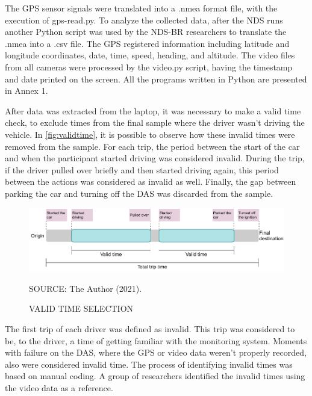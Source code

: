 The GPS sensor signals were translated into a .nmea format file, with the execution of gps-read.py. To analyze the collected data, after the NDS runs another Python script was used by the NDS-BR researchers to translate the .nmea into a .csv file. The GPS registered information including latitude and longitude coordinates, date, time, speed, heading, and altitude. The video files from all cameras were processed by the video.py script, having the timestamp and date printed on the screen. All the programs written in Python are presented in Annex 1. 

After data was extracted from the laptop, it was necessary to make a valid time check, to exclude times from the final sample where the driver wasn't driving the vehicle. In \autoref{fig:validtime}, it is possible to observe how these invalid times were removed from the sample. For each trip, the period between the start of the car and when the participant started driving was considered invalid. During the trip, if the driver pulled over briefly and then started driving again, this period between the actions was considered as invalid as well. Finally, the gap between parking the car and turning off the DAS was discarded from the sample.  

\begin{figure}[!htbp]
    \centering\footnotesize
    \captionsetup{font=footnotesize}
    \caption{VALID TIME SELECTION}
    \includegraphics{fig/validtime.pdf}
    \label{fig:validtime}
    \par SOURCE: The Author (2021).
\end{figure}

The first trip of each driver was defined as invalid. This trip was considered to be, to the driver, a time of getting familiar with the monitoring system. Moments with failure on the DAS, where the GPS or video data weren't properly recorded, also were considered invalid time. The process of identifying invalid times was based on manual coding. A group of researchers identified the invalid times using the video data as a reference. 


